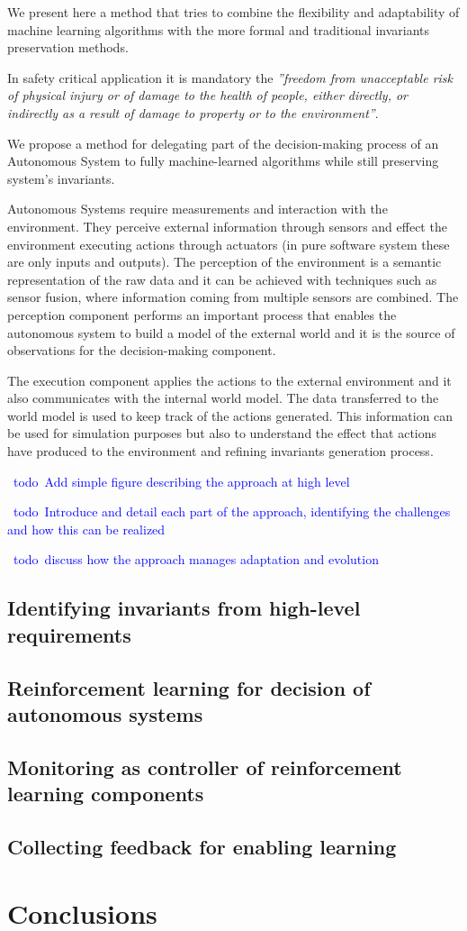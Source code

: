 \documentclass[sigconf,review, anonymous]{acmart}
\newcommand{\todo}[1]{\textcolor{blue}{\ding{46}~{\sf todo}~#1}}
\begin{document}
We present here a method that tries to combine the flexibility and adaptability of machine learning algorithms with the more formal and traditional invariants preservation methods.

In safety critical application it is mandatory the \emph{''freedom from unacceptable risk of physical injury or of damage to the health of people, either directly, or indirectly as a result of damage to property or to the environment''}.

We propose a method for delegating part of the decision-making process of an Autonomous System to fully machine-learned algorithms while still preserving system's invariants.

Autonomous Systems require measurements and interaction with the environment.  They perceive external information through sensors and effect the environment executing actions through actuators (in pure software system these are only inputs and outputs).  The perception of the environment is a semantic representation of the raw data and it can be achieved with techniques such as sensor fusion, where information coming from multiple sensors are combined. The perception component performs an important process that enables the autonomous system to build a model of the external world and it is the source of observations for the decision-making component.

The execution component applies the actions to the external environment and it also communicates with the internal world model. The data transferred to the world model is used to keep track of the actions generated. This information can be used for simulation purposes but also to understand the effect that actions have produced to the environment and refining invariants generation process.

\todo{Add simple figure describing the approach at high level}

\todo{Introduce and detail each part of the approach, identifying the challenges and how this can be realized}

\todo{discuss how the approach manages adaptation and evolution}

\subsection{Identifying invariants from high-level requirements}

\subsection{Reinforcement learning for decision of autonomous systems}

\subsection{Monitoring as controller of reinforcement learning components}

\subsection{Collecting feedback for enabling learning}


\section{Conclusions}\label{sec:conclusions}

\balance



\end{document}
